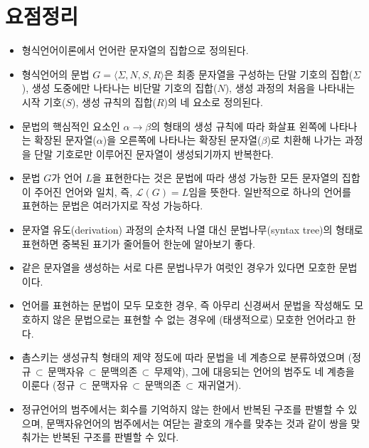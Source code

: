 \documentclass[b5paper,chapter,figtabcapt]{oblivoir}
\begin{document}
\section*{요점정리}
\begin{itemize}
    \item 형식언어이론에서 언어란 문자열의 집합으로 정의된다.
    \item 형식언어의 문법 $G=\langle\Sigma,N,S,R\rangle$은
    최종 문자열을 구성하는 단말 기호의 집합($\Sigma$),
    생성 도중에만 나타나는 비단말 기호의 집합($N$),
    생성 과정의 처음을 나타내는 시작 기호($S$),
    생성 규칙의 집합($R$)의 네 요소로 정의된다.
    \item 문법의 핵심적인 요소인 $\alpha\to\beta$의 형태의 생성 규칙에 따라
    화살표 왼쪽에 나타나는 확장된 문자열($\alpha$)을 오른쪽에 나타나는
    확장된 문자열($\beta$)로 치환해 나가는 과정을 단말 기호로만 이루어진
    문자열이 생성되기까지 반복한다.
    \item 문법 $G$가 언어 $L$을 표현한다는 것은 문법에 따라 생성 가능한 모든
    문자열의 집합이 주어진 언어와 일치, 즉, $\mathcal{L}(G) = L$임을 뜻한다.
    일반적으로 하나의 언어를 표현하는 문법은 여러가지로 작성 가능하다.
    \item 문자열 유도(derivation) 과정의 순차적 나열 대신
    문법나무(syntax tree)의 형태로 표현하면 중복된 표기가 줄어들어
    한눈에 알아보기 좋다.
    \item 같은 문자열을 생성하는 서로 다른 문법나무가 여럿인 경우가
    있다면 모호한 문법이다.
    \item 언어를 표현하는 문법이 모두 모호한 경우, 즉 아무리 신경써서
    문법을 작성해도 모호하지 않은 문법으로는 표현할 수 없는 경우에
    (태생적으로) 모호한 언어라고 한다.
    \item 촘스키는 생성규칙 형태의 제약 정도에 따라 문법을 네 계층으로 분류하였으며
    (정규$\,\subset\,$문맥자유$\,\subset\,$문맥의존$\,\subset\,$무제약),
    그에 대응되는 언어의 범주도 네 계층을 이룬다
    (정규$\,\subset\,$문맥자유$\,\subset\,$문맥의존$\,\subset\,$재귀열거).
    \item 정규언어의 범주에서는 회수를 기억하지 않는 한에서 반복된 구조를
    판별할 수 있으며, 문맥자유언어의 범주에서는 여닫는 괄호의 개수를 맞추는
    것과 같이 쌍을 맞춰가는 반복된 구조를 판별할 수 있다.
\end{itemize}
\end{document}
